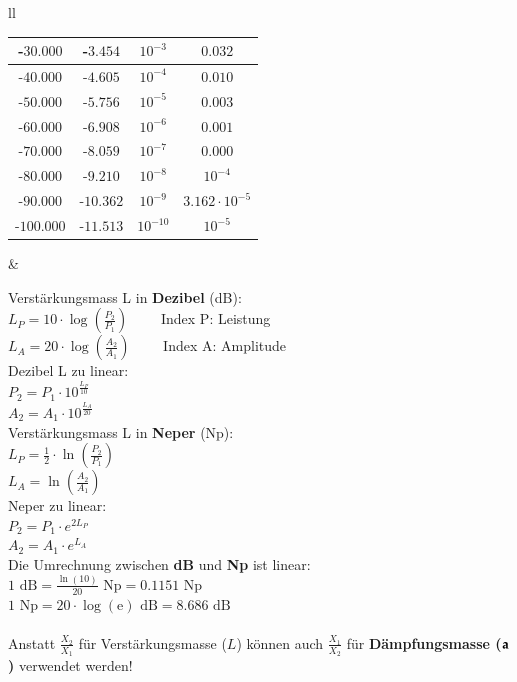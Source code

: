 \begin{tabular}{ll}
{\begin{tabular}{|c|c|c|c|}
			-$30.000$ & -$3.454$ & $10^{-3}$ & $0.032$ \\ \hline
			-$40.000$ & -$4.605$ & $10^{-4}$ & $0.010$ \\ \hline
			-$50.000$ & -$5.756$ & $10^{-5}$ & $0.003$ \\ \hline
			-$60.000$ & -$6.908$ & $10^{-6}$ & $0.001$ \\ \hline
			-$70.000$ & -$8.059$ & $10^{-7}$ & $0.000$ \\ \hline
			-$80.000$ & -$9.210$ & $10^{-8}$ & $10^{-4}$ \\ \hline
			-$90.000$ & -$10.362$ & $10^{-9}$ & $3.162 \cdot 10^{-5}$ \\ \hline
			-$100.000$ & -$11.513$ & $10^{-10}$ & $10^{-5}$ \\ \hline
		\end{tabular}
	}
	& \parbox{11.5cm}{
		\normalsize
		Verstärkungsmass L in \textbf{Dezibel} (dB):\\
		$L_P = 10 \cdot \log \left(\frac {P_2} {P_1}\right) \qquad$ Index P: Leistung \\
		$L_A = 20 \cdot \log \left(\frac {A_2} {A_1}\right) \qquad$ Index A: Amplitude \\ 
		
		Dezibel L zu linear: \\
		$P_2 = P_1 \cdot 10^{\frac{L_P}{10}} $ \\
		$A_2 = A_1 \cdot 10^{\frac{L_A}{20}} $ \\
		
		Verstärkungsmass L in \textbf{Neper} (Np):\\
		$L_P = \frac {1}{2} \cdot \ln \left(\frac {P_2} {P_1}\right)$\\
		$L_A = \ln \left(\frac {A_2} {A_1} \right)$ \\
		
		Neper zu linear: \\
		$P_2 = P_1 \cdot e^{2 L_P}$ \\
		$A_2 = A_1 \cdot e^{L_A}$ \\
		
		Die Umrechnung zwischen {\bf dB} und {\bf Np} ist linear: \\
		$1\mbox{~dB} = \frac {\ln(10)} {20} \mbox{~Np} = 0.1151\mbox{~Np}$ \\
		$1\mbox{~Np} = 20 \cdot \log(\mbox{e}) \mbox{~dB} = 8.686\mbox{~dB}$ \\ 
		\\
		Anstatt $\frac{X_2}{X_1}$ für Verstärkungsmasse ($L$) können auch
		$\frac{X_1}{X_2}$ für \newline \textbf{Dämpfungsmasse ($\bf{a}$)} verwendet werden!
		
}
\end{tabular}
